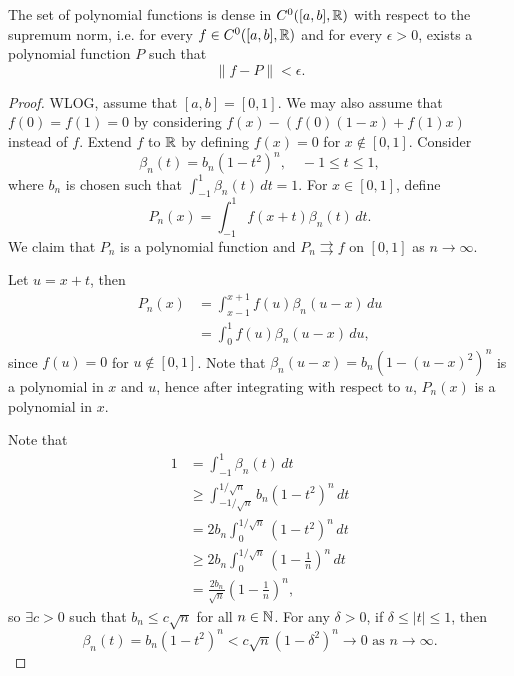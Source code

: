 \begin{thm}
    The set of polynomial functions is dense in $C^0([a, b], {\mathbb R})$ with respect to the supremum norm, i.e. for every $f \in C^0([a, b], {\mathbb R})$ and for every $\epsilon > 0$, exists a polynomial function $P$ such that
    \[
    \|f - P\| < \epsilon.
    \]
    \begin{proof}
        WLOG, assume that $[a, b] = [0, 1]$. We may also assume that $f(0) = f(1) = 0$ by considering $f(x) - (f(0)(1 - x) + f(1)x)$ instead of $f$. Extend $f$ to ${\mathbb R}$ by defining $f(x) = 0$ for $x \notin [0, 1]$. Consider
        \[
        \beta_n(t) = b_n(1 - t^2)^n, \quad -1 \leq t \leq 1,
        \]
        where $b_n$ is chosen such that $\int_{-1}^1 \beta_n(t) \, dt = 1$. For $x \in [0, 1]$, define
        \[
        P_n(x) = \int_{-1}^1 f(x + t) \beta_n(t) \, dt.
        \]
        We claim that $P_n$ is a polynomial function and $P_n \rightrightarrows f$ on $[0, 1]$ as $n \to \infty$.

        Let $u = x + t$, then
        \begin{align*}
            P_n(x) &= \int_{x-1}^{x+1} f(u) \beta_n(u - x) \, du \\
            &= \int_0^1 f(u) \beta_n(u - x) \, du,
        \end{align*}
        since $f(u) = 0$ for $u \notin [0, 1]$. Note that $\beta_n(u - x) = b_n(1 - (u - x)^2)^n$ is a polynomial in $x$ and $u$, hence after integrating with respect to $u$, $P_n(x)$ is a polynomial in $x$.

        Note that
        \begin{align*}
            1 &= \int_{-1}^1 \beta_n(t) \, dt \\
            &\geq \int_{-1/\sqrt{n}}^{1/\sqrt{n}} b_n(1 - t^2)^n \, dt \\
            &= 2 b_n \int_0^{1/\sqrt{n}} (1 - t^2)^n \, dt \\
            &\geq 2 b_n \int_0^{1/\sqrt{n}} \left(1 - \frac{1}{n}\right)^n \, dt \\
            &= \frac{2 b_n}{\sqrt{n}} \left(1 - \frac{1}{n}\right)^n,
        \end{align*}
        so $\exists c > 0$ such that $b_n \leq c \sqrt{n}$ for all $n \in {\mathbb N}$. For any $\delta > 0$, if $\delta \leq |t| \leq 1$, then
        \[
        \beta_n(t) = b_n(1 - t^2)^n < c \sqrt{n} (1 - \delta^2)^n \to 0 \text{ as } n \to \infty.
        \]


\end{proof}
\end{thm}
